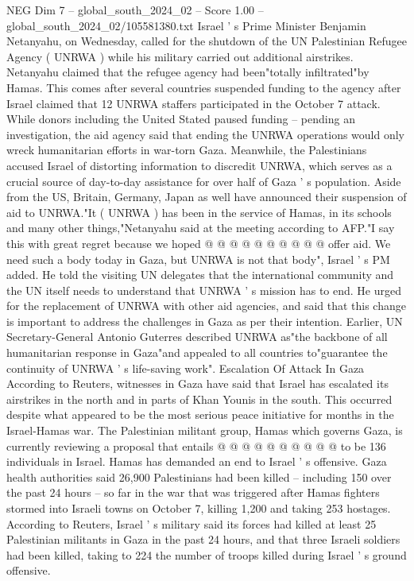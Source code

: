 \begin{textsample}{NEG Dim 7 – global\_south\_2024\_02 – Score 1.00 – global\_south\_2024\_02/105581380.txt}  \label{ex:f7_neg_254}
Israel ' s Prime Minister Benjamin Netanyahu, on Wednesday, called for the shutdown of the UN Palestinian Refugee Agency ( UNRWA ) while his military carried out additional airstrikes.
Netanyahu claimed that the refugee agency had been"totally infiltrated"by Hamas.
This comes after several countries suspended funding to the agency after Israel claimed that 12 UNRWA staffers participated in the October 7 attack.
While donors including the United Stated paused funding -- pending an investigation, the aid agency said that ending the UNRWA operations would only wreck humanitarian efforts in war-torn Gaza.
Meanwhile, the Palestinians accused Israel of distorting information to discredit UNRWA, which serves as a crucial source of day-to-day assistance for over half of Gaza ' s population.
Aside from the US, Britain, Germany, Japan as well have announced their suspension of aid to UNRWA."It ( UNRWA ) has been in the service of Hamas, in its schools and many other things,"Netanyahu said at the meeting according to AFP."I say this with great regret because we hoped @ @ @ @ @ @ @ @ @ @ offer aid.
We need such a body today in Gaza, but UNRWA is not that body", Israel ' s PM added.
He told the visiting UN delegates that the international community and the UN itself needs to understand that UNRWA ' s mission has to end.
He urged for the replacement of UNRWA with other aid agencies, and said that this change is important to address the challenges in Gaza as per their intention.
Earlier, UN Secretary-General Antonio Guterres described UNRWA as"the backbone of all humanitarian response in Gaza"and appealed to all countries to"guarantee the continuity of UNRWA ' s life-saving work".
Escalation Of Attack In Gaza According to Reuters, witnesses in Gaza have said that Israel has escalated its airstrikes in the north and in parts of Khan Younis in the south.
This occurred despite what appeared to be the most serious peace initiative for months in the Israel-Hamas war.
The Palestinian militant group, Hamas which governs Gaza, is currently reviewing a proposal that entails @ @ @ @ @ @ @ @ @ @ to be 136 individuals in Israel.
Hamas has demanded an end to Israel ' s offensive.
Gaza health authorities said 26,900 Palestinians had been killed -- including 150 over the past 24 hours -- so far in the war that was triggered after Hamas fighters stormed into Israeli towns on October 7, killing 1,200 and taking 253 hostages.
According to Reuters, Israel ' s military said its forces had killed at least 25 Palestinian militants in Gaza in the past 24 hours, and that three Israeli soldiers had been killed, taking to 224 the number of troops killed during Israel ' s ground offensive.

\end{textsample}
